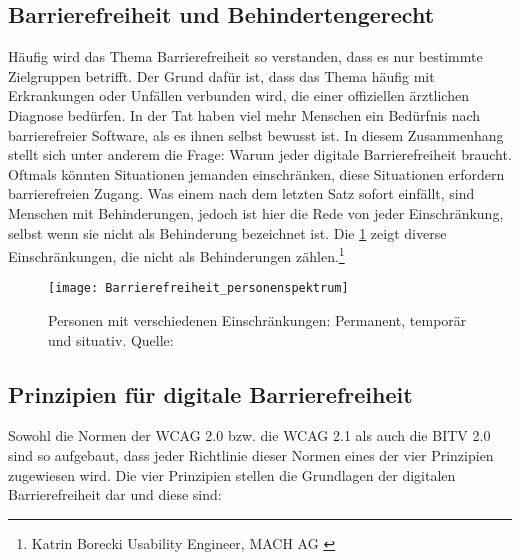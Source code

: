 \subsection{Barrierefreiheit und Behindertengerecht}
\label{subsec:Barrierefreiheit und Behindertengerecht}
Häufig wird das Thema Barrierefreiheit so verstanden, dass es nur bestimmte Zielgruppen betrifft. Der Grund dafür ist, dass das Thema häufig mit Erkrankungen oder Unfällen verbunden wird, die einer offiziellen ärztlichen Diagnose bedürfen. In der Tat haben viel mehr Menschen ein Bedürfnis nach barrierefreier Software, als es ihnen selbst bewusst ist. In diesem Zusammenhang stellt sich unter anderem die Frage: Warum jeder digitale Barrierefreiheit braucht. Oftmals könnten Situationen jemanden einschränken, diese Situationen erfordern barrierefreien Zugang. Was einem nach dem letzten Satz sofort einfällt, sind Menschen mit Behinderungen, jedoch ist hier die Rede von jeder Einschränkung, selbst wenn sie nicht als Behinderung bezeichnet ist. Die \cref{fig:Beispielhafte Einschränkungen} zeigt diverse Einschränkungen, die nicht als Behinderungen zählen.\footnote{Katrin Borecki Usability Engineer, MACH AG \cite{mach}}

\begin{figure}[H]
	\centering
	\texttt{[image: Barrierefreiheit\_personenspektrum]}
	\caption[Personen mit verschiedenen Einschränkungen: Permanent, temporär und situativ]{Personen mit verschiedenen Einschränkungen: Permanent, temporär und situativ. 
	 Quelle: \cite{mach}}
	\label{fig:Beispielhafte Einschränkungen}
\end{figure}

\subsection{Prinzipien für digitale Barrierefreiheit}
\label{subsec:Prinzipien fuer Barrierefreiheit}

Sowohl die Normen der \ac{WCAG} 2.0 bzw. die \ac{WCAG} 2.1 als auch die \ac{BITV} 2.0 sind so aufgebaut, dass jeder Richtlinie dieser Normen eines der vier Prinzipien zugewiesen wird. Die vier Prinzipien stellen die Grundlagen der digitalen Barrierefreiheit dar und diese sind:

